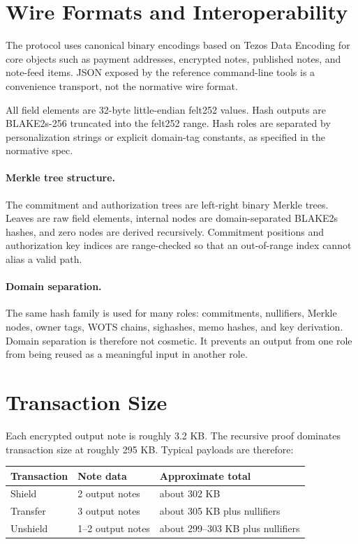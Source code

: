 \documentclass[11pt]{article}
\begin{document}
\section{Wire Formats and Interoperability}

The protocol uses canonical binary encodings based on Tezos Data Encoding for
core objects such as payment addresses, encrypted notes, published notes, and
note-feed items. JSON exposed by the reference command-line tools is a
convenience transport, not the normative wire format.

All field elements are 32-byte little-endian felt252 values. Hash outputs are
BLAKE2s-256 truncated into the felt252 range. Hash roles are separated by
personalization strings or explicit domain-tag constants, as specified in the
normative spec.

\paragraph{Merkle tree structure.}
The commitment and authorization trees are left-right binary Merkle trees.
Leaves are raw field elements, internal nodes are domain-separated BLAKE2s
hashes, and zero nodes are derived recursively. Commitment positions and
authorization key indices are range-checked so that an out-of-range index cannot
alias a valid path.

\paragraph{Domain separation.}
The same hash family is used for many roles: commitments, nullifiers, Merkle
nodes, owner tags, WOTS chains, sighashes, memo hashes, and key derivation.
Domain separation is therefore not cosmetic. It prevents an output from one
role from being reused as a meaningful input in another role.

\section{Transaction Size}

Each encrypted output note is roughly 3.2 KB. The recursive proof dominates
transaction size at roughly 295 KB. Typical payloads are therefore:

\begin{center}
\begin{tabular}{lll}
\toprule
Transaction & Note data & Approximate total \\
\midrule
Shield & 2 output notes & about 302 KB \\
Transfer & 3 output notes & about 305 KB plus nullifiers \\
Unshield & 1--2 output notes & about 299--303 KB plus nullifiers \\
\bottomrule
\end{tabular}
\end{center}
\end{document}
